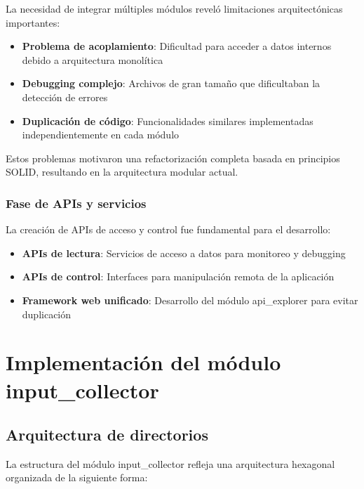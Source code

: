 La necesidad de integrar múltiples módulos reveló limitaciones arquitectónicas importantes:

\begin{itemize}
    \item \textbf{Problema de acoplamiento}: Dificultad para acceder a datos internos debido a arquitectura monolítica
    \item \textbf{Debugging complejo}: Archivos de gran tamaño que dificultaban la detección de errores
    \item \textbf{Duplicación de código}: Funcionalidades similares implementadas independientemente en cada módulo
\end{itemize}

Estos problemas motivaron una refactorización completa basada en principios SOLID, resultando en la arquitectura modular actual.

\subsubsection{Fase de APIs y servicios}

La creación de APIs de acceso y control fue fundamental para el desarrollo:

\begin{itemize}
    \item \textbf{APIs de lectura}: Servicios de acceso a datos para monitoreo y debugging
    \item \textbf{APIs de control}: Interfaces para manipulación remota de la aplicación
    \item \textbf{Framework web unificado}: Desarrollo del módulo api\_explorer para evitar duplicación
\end{itemize}

\section{Implementación del módulo input\_collector}
\label{sec:implementacion_input_collector}

\subsection{Arquitectura de directorios}
\label{subsec:arquitectura_directorios_input}

La estructura del módulo input\_collector refleja una arquitectura hexagonal organizada de la siguiente forma:

